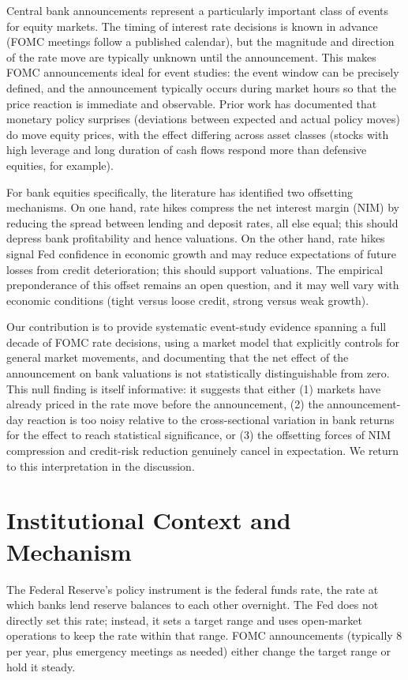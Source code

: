 \documentclass[11pt]{article}
\begin{document}
Central bank announcements represent a particularly important class of events for equity markets. The timing of interest rate decisions is known in advance (FOMC meetings follow a published calendar), but the magnitude and direction of the rate move are typically unknown until the announcement. This makes FOMC announcements ideal for event studies: the event window can be precisely defined, and the announcement typically occurs during market hours so that the price reaction is immediate and observable. Prior work has documented that monetary policy surprises (deviations between expected and actual policy moves) do move equity prices, with the effect differing across asset classes (stocks with high leverage and long duration of cash flows respond more than defensive equities, for example).

For bank equities specifically, the literature has identified two offsetting mechanisms. On one hand, rate hikes compress the net interest margin (NIM) by reducing the spread between lending and deposit rates, all else equal; this should depress bank profitability and hence valuations. On the other hand, rate hikes signal Fed confidence in economic growth and may reduce expectations of future losses from credit deterioration; this should support valuations. The empirical preponderance of this offset remains an open question, and it may well vary with economic conditions (tight versus loose credit, strong versus weak growth).

Our contribution is to provide systematic event-study evidence spanning a full decade of FOMC rate decisions, using a market model that explicitly controls for general market movements, and documenting that the net effect of the announcement on bank valuations is not statistically distinguishable from zero. This null finding is itself informative: it suggests that either (1) markets have already priced in the rate move before the announcement, (2) the announcement-day reaction is too noisy relative to the cross-sectional variation in bank returns for the effect to reach statistical significance, or (3) the offsetting forces of NIM compression and credit-risk reduction genuinely cancel in expectation. We return to this interpretation in the discussion.

\section{Institutional Context and Mechanism}

The Federal Reserve's policy instrument is the federal funds rate, the rate at which banks lend reserve balances to each other overnight. The Fed does not directly set this rate; instead, it sets a target range and uses open-market operations to keep the rate within that range. FOMC announcements (typically 8 per year, plus emergency meetings as needed) either change the target range or hold it steady.
\end{document}
